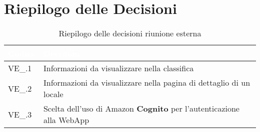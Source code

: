 \section{Riepilogo delle Decisioni}


\begin{table}[!htbp]
\renewcommand{\arraystretch}{1.5}
\begin{tabular}{m{}<{\centering}  m{}<{\centering}}
\rowcolor{darkblue} \textcolor{white}{\textbf{Codice}} & \textcolor{white}{\textbf{Decisione}} \\
\hline
VE\_\D{}.1 & Informazioni da visualizzare nella classifica\\
VE\_\D{}.2 & Informazioni da visualizzare nella pagina di dettaglio di un locale\\
VE\_\D{}.3 & Scelta dell'uso di Amazon \textbf{Cognito} per l'autenticazione alla WebApp\\

\end{tabular}
\caption{Riepilogo delle decisioni riunione esterna \D{}}
\end{table}